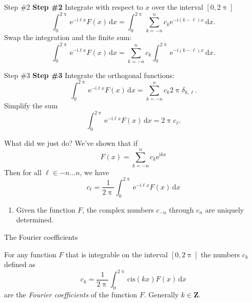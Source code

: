 \documentclass[portrait,fleqn,12pt]{beamer}
\newcommand{\integers}{\mathbf{Z}}
\newcommand{\cis}{\mathrm{cis}}
\newcommand{\euler}{\mathrm{e}}
\newcommand{\imag}{\mathrm{i}}
\newenvironment{handlist}
   {\begin{enumerate}[\faHandPointRight]
       \addtolength{\itemsep}{0.0\itemsep}}
     {\end{enumerate}}
\begin{document}
\begin{frame}{Step \#2}
    \textbf{Step \#2} Integrate with respect to $x$ over the 
    interval $[0, 2 \uppi]$
    \begin{equation}
       \int_0^{2 \uppi} \euler^{-\imag  \ell x} F(x) \,
         \mathrm{d}x =  \int_0^{2 \uppi} \sum_{k=-n}^n c_k 
        \euler^{-\imag  (k - \ell) x} \,
        \mathrm{d}x.
 \end{equation}
 Swap the integration and the finite sum:
 \begin{equation}
       \int_0^{2 \uppi} \euler^{-\imag  \ell x} F(x) \,
         \mathrm{d}x =  \sum_{k=-n}^n c_k 
         \int_0^{2 \uppi}  \euler^{-\imag  (k - \ell) x} \,   \mathrm{d}x.
 \end{equation}
 \end{frame}
 
 \begin{frame}{Step \#3}
   \textbf{Step \#3} Integrate the orthogonal functions:
   \begin{equation}
       \int_0^{2 \uppi} \euler^{-\imag  \ell x} F(x) \,
         \mathrm{d}x =  \sum_{k=-n}^n c_k  2 \uppi \delta_{k, \ell} .
       \end{equation}
   Simplify the sum
   \begin{equation}
       \int_0^{2 \uppi} \euler^{-\imag  \ell x} F(x) \,
         \mathrm{d}x =   2 \uppi c_\ell.
       \end{equation}
  
 \end{frame}
 
 \begin{frame}{What did we just do?}
 We've shown that if 
 \begin{equation}
    F(x) = \sum_{k=-n}^n c_k \euler^{\imag  k x}
\end{equation}
Then for all $\ell \in -n \dots n$, we have
\begin{equation}
   c_\ell = \frac{1}{2 \uppi} \int_0^{2 \uppi} \euler^{-\imag  \ell x} F(x) \, \mathrm{d}x
\end{equation}
\begin{handlist}
\item Given the function $F$, the complex numbers $c_{-n}$ through $c_n$ are uniquely determined.
\end{handlist}
 \end{frame}
 
 \begin{frame}{The Fourier coefficients}
 
 For any function $F$ that is integrable on the interval $[0,2 \uppi]$ the numbers $c_k$ defined as
 \begin{equation*}
   c_k = \frac{1}{2 \uppi} \int_0^{2 \uppi} \cis(k x) F(x) \, \mathrm{d} x
 \end{equation*}
 are the \emph{Fourier coefficients} of the function $F$.  Generally $k \in \integers$.
 
 
 \end{frame}
 
\end{document}
